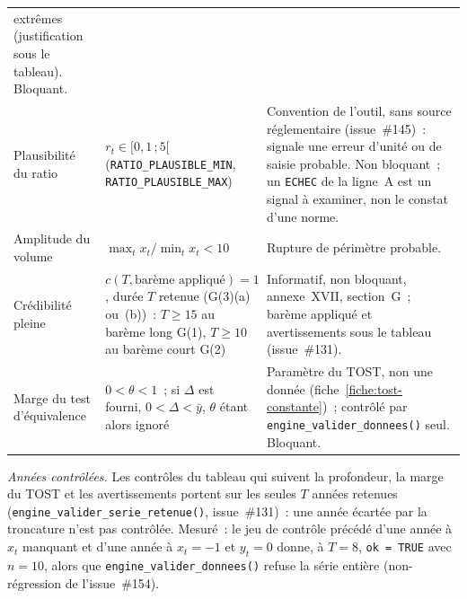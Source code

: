 \documentclass[a4paper,11pt]{article}
\newcommand{\code}[1]{\texttt{\small #1}}
\begin{document}
\begin{center}
\begin{tabular}{@{}p{4.4cm}p{5.0cm}p{5.4cm}@{}}
extrêmes (justification sous le tableau). Bloquant. \\
Plausibilité du ratio & $r_t \in [0{,}1\,;5[$ (\code{RATIO\_PLAUSIBLE\_MIN},
\code{RATIO\_PLAUSIBLE\_MAX}) & Convention de l'outil, sans source réglementaire
(issue~\#145)~: signale une erreur d'unité ou de saisie probable. Non bloquant~; un
\code{ECHEC} de la ligne~A est un signal à examiner, non le constat d'une norme. \\
Amplitude du volume & $\max_t x_t/\min_t x_t < 10$ & Rupture de périmètre probable. \\
Crédibilité pleine & $c(T, \text{barème appliqué}) = 1$, durée $T$ retenue (G(3)(a) ou~(b))~:
$T \ge 15$ au barème long G(1), $T \ge 10$ au barème court G(2) & Informatif, non bloquant,
annexe~XVII, section~G~; barème appliqué et avertissements sous le tableau (issue~\#131). \\
Marge du test d'équivalence & $0 < \theta < 1$~; si $\Delta$ est fourni,
$0 < \Delta < \bar y$, $\theta$ étant alors ignoré & Paramètre du TOST, non une donnée
(fiche~\ref{fiche:tost-constante})~; contrôlé par \code{engine\_valider\_donnees()} seul.
Bloquant. \\
\end{tabular}
\end{center}

\emph{Années contrôlées.} Les contrôles du tableau qui suivent la profondeur, la marge du TOST et
les avertissements portent sur les seules $T$ années retenues
(\code{engine\_}\allowbreak\code{valider\_serie\_retenue()}, issue~\#131)~: une année écartée par la
troncature n'est pas contrôlée. Mesuré~: le jeu de contrôle précédé d'une année à $x_t$ manquant et
d'une année à $x_t = -1$ et $y_t = 0$ donne, à $T = 8$, \code{ok = TRUE} avec $n = 10$, alors que
\code{engine\_valider\_donnees()} refuse la série entière (non-régression de l'issue~\#154).
\end{document}

